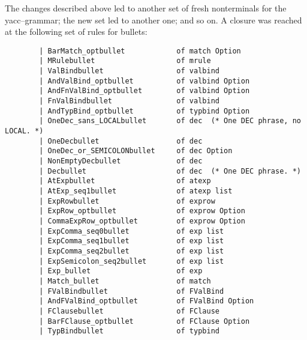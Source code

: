   The changes described above led to another set of fresh nonterminals
  for the yacc--grammar; the new set led to another one; and so on. A
  closure was reached at the following set of rules for bullets:
  {\small
\begin{verbatim}
        | BarMatch_optbullet            of match Option
        | MRulebullet                   of mrule
        | ValBindbullet                 of valbind
        | AndValBind_optbullet          of valbind Option
        | AndFnValBind_optbullet        of valbind Option
        | FnValBindbullet               of valbind
        | AndTypBind_optbullet          of typbind Option
        | OneDec_sans_LOCALbullet       of dec  (* One DEC phrase, no LOCAL. *)
        | OneDecbullet                  of dec
        | OneDec_or_SEMICOLONbullet     of dec Option
        | NonEmptyDecbullet             of dec
        | Decbullet                     of dec  (* One DEC phrase. *)
        | AtExpbullet                   of atexp
        | AtExp_seq1bullet              of atexp list
        | ExpRowbullet                  of exprow
        | ExpRow_optbullet              of exprow Option
        | CommaExpRow_optbullet         of exprow Option
        | ExpComma_seq0bullet           of exp list
        | ExpComma_seq1bullet           of exp list
        | ExpComma_seq2bullet           of exp list
        | ExpSemicolon_seq2bullet       of exp list
        | Exp_bullet                    of exp
        | Match_bullet                  of match
        | FValBindbullet                of FValBind
        | AndFValBind_optbullet         of FValBind Option
        | FClausebullet                 of FClause
        | BarFClause_optbullet          of FClause Option
        | TypBindbullet                 of typbind
\end{verbatim}}


